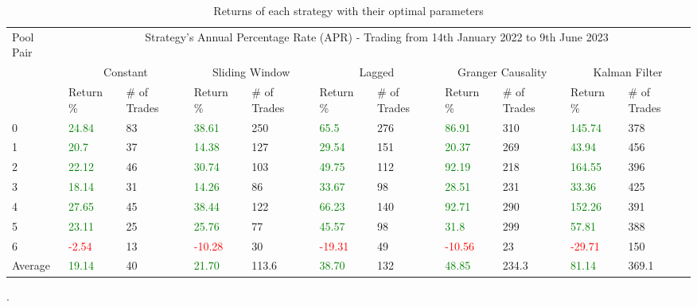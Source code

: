 \begin{table}[!htb]
    \centering
    \begin{adjustwidth}{-0.8in}{-0.9in}
        \begin{tabular}{|p{4em}|p{3em}|p{3em}|p{3em}|p{3em}|p{3em}|p{3em}|p{3em}|p{3em}|p{3em}|p{3em}|}\hline
            Pool Pair & \multicolumn{10}{|c|}{Strategy's Annual Percentage Rate (APR) - Trading from 14th January 2022 to 9th June 2023} \\\cline{2-11}
            & \multicolumn{2}{|c|}{Constant} & \multicolumn{2}{|c|}{Sliding Window} & \multicolumn{2}{|c|}{Lagged} & \multicolumn{2}{|c|}{Granger Causality} & \multicolumn{2}{|c|}{Kalman Filter}\\\cline{2-11}
            & Return \% & \# of Trades & Return \% & \# of Trades & Return \% & \# of Trades & Return \% & \# of Trades & Return \% & \# of Trades\\\hline
            0 & \textcolor{green}{24.84} & 83 & \textcolor{green}{38.61} & 250 & \textcolor{green}{65.5} & 276 & \textcolor{green}{86.91} & 310 & \textcolor{green}{145.74} & 378\\\cline{2-11}
            1 & \textcolor{green}{20.7} & 37 & \textcolor{green}{14.38} & 127 & \textcolor{green}{29.54} & 151 & \textcolor{green}{20.37} & 269 & \textcolor{green}{43.94} & 456\\\cline{2-11}
            2 & \textcolor{green}{22.12} & 46 & \textcolor{green}{30.74} & 103 & \textcolor{green}{49.75} & 112 & \textcolor{green}{92.19} & 218 & \textcolor{green}{164.55} & 396\\\cline{2-11}
            3 & \textcolor{green}{18.14} & 31 & \textcolor{green}{14.26} & 86 & \textcolor{green}{33.67} & 98 & \textcolor{green}{28.51} & 231 & \textcolor{green}{33.36} & 425\\\cline{2-11}
            4 & \textcolor{green}{27.65} & 45 & \textcolor{green}{38.44} & 122 & \textcolor{green}{66.23} & 140 & \textcolor{green}{92.71} & 290 & \textcolor{green}{152.26} & 391\\\cline{2-11}
            5 & \textcolor{green}{23.11} & 25 & \textcolor{green}{25.76} & 77 & \textcolor{green}{45.57} & 98 & \textcolor{green}{31.8} & 299 & \textcolor{green}{57.81} & 388\\\cline{2-11}
            6 & \textcolor{red}{-2.54} & 13 & \textcolor{red}{-10.28} & 30 & \textcolor{red}{-19.31} & 49 & \textcolor{red}{-10.56} & 23 & \textcolor{red}{-29.71} & 150\\\hline\hline           
            Average & \textcolor{green}{19.14} & 40 & \textcolor{green}{21.70} & 113.6 & \textcolor{green}{38.70} & 132 & \textcolor{green}{48.85} & 234.3 & \textcolor{green}{81.14} & 369.1\\\hline                       
        \end{tabular}
    \end{adjustwidth}
    \caption{Returns of each strategy with their optimal parameters \label{tab:FinalResults}}.
\end{table}

